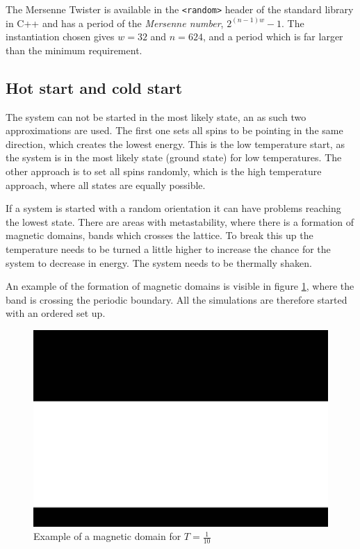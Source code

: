 \documentclass[11pt,a4paper,final]{article}
\numberwithin{equation}{section}
\newcommand{\figurewidth}{.85\textwidth}
\begin{document}
The Mersenne Twister is available in the \texttt{<random>} header 
of the standard
library in C++ and has a period of the \emph{Mersenne number},
$2^{(n-1)w}-1$.
The instantiation chosen gives $w=32$ and $n=624$, and a period which is 
far larger than the minimum requirement.

\subsection{Hot start and cold start}
The system can not be started in the most likely state, an as such two 
approximations are used. The first one sets all spins to be pointing in 
the same direction, which creates the lowest energy. This is the 
low temperature start, as the system is in the most likely state 
(ground state) for low temperatures. The other approach is to set 
all spins randomly, which is the high temperature approach, where 
all states are equally possible.

If a system is started with a random orientation it can have problems 
reaching the lowest state. There are areas with metastability, where 
there is a formation of magnetic domains, bands which crosses the lattice.
To break this up the temperature needs to be turned a little higher to 
increase the chance for the system to decrease in energy. The system 
needs to be thermally shaken.

An example of the formation of magnetic domains is visible in 
figure \ref{fig:mag_domain}, where the band is crossing the periodic 
boundary. All the simulations are therefore started with an ordered
set up.

\begin{figure}
\centering
\includegraphics[width=\figurewidth]{pics/mag_domain.png}
\caption{Example of a magnetic domain for $T = \frac{1}{10}$}
\label{fig:mag_domain}
\end{figure}
\end{document}
